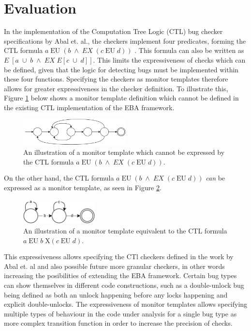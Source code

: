 \section{Evaluation}

In the implementation of the Computation Tree Logic (CTL) bug checker specifications by Abal et. al., the checkers implement four predicates, forming the CTL formula $a\;\text{EU}\;(b\;\land\;EX\;(c\;\text{EU}\;d))$ \cite{Abal2017EffectiveBF}\cite{research-project}. This formula can also be written as $E\;[a\;\cup\;b\;\land\;EX\;E[c\;\cup\;d]]$. This limits the expressiveness of checks which can be defined, given that the logic for detecting bugs must be implemented within these four functions. Specifying the checkers as monitor templates therefore allows for greater expressiveness in the checker definition. To illustrate this, Figure \ref{expressive-monitor} below shows a monitor template definition which cannot be defined in the existing CTL implementation of the EBA framework. 

\begin{figure}[H]
    \centering
    \includegraphics[width=0.5\textwidth]{evaluation/figures/monitor}
    \caption{An illustration of a monitor template which cannot be expressed by the CTL formula $a\;\text{EU}\;(b\;\land\;EX\;(c\;\text{EU}\;d))$.}
    \label{expressive-monitor}
\end{figure}

\newpar On the other hand, the CTL formula $a\;\text{EU}\;(b\;\land\;EX\;(c\;\text{EU}\;d))$ \textit{can} be expressed as a monitor template, as seen in Figure \ref{ctl-as-monitor}. 

\begin{figure}[H]
    \centering
    \includegraphics[width=0.35\textwidth]{evaluation/figures/ctl-as-monitor}
    \caption{An illustration of a monitor template equivalent to the CTL formula $a\;\text{EU}\;b\;\text{X}(c\;\text{EU}\;d)$.}
    \label{ctl-as-monitor}
\end{figure}

\newpar This expressiveness allows specifying the CTl checkers defined in the work by Abal et. al and also possible future more granular checkers, in other words increasing the posibilities of extending the EBA framework. Certain bug types can show themselves in different code constructions, such as a double-unlock bug being defined as both an unlock happening before any locks happening and explicit double-unlocks. The expressiveness of monitor templates allows specifying multiple types of behaviour in the code under analysis for a single bug type as more complex transition function in order to increase the precision of checks.

